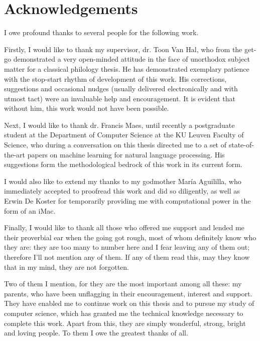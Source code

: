 

\begingroup
\let\clearpage\relax
\let\cleardoublepage\relax
\let\cleardoublepage\relax

\chapter{Acknowledgements}
\label{chap:acknowledgments}
\mtcaddchapter
I owe profound thanks to several people for the following
work. 

Firstly, I would like to thank my supervisor, dr. Toon Van Hal, who from
the get-go demonstrated a very open-minded attitude in the face of
unorthodox subject matter for a classical philology thesis. He has
demonstrated exemplary patience with the stop-start rhythm of
development of this work. His corrections, suggestions and occasional
nudges (usually delivered electronically and with utmost tact) were an
invaluable help and encouragement. It is evident that without him,
this work would not have been possible.

Next, I would like to thank dr. Francis Maes, until recently a
postgraduate student at the Department of Computer Science at the KU
Leuven Faculty of Science, who during a conversation on this thesis
directed me to a set of state-of-the-art papers on machine learning
for natural language processing. His suggestions form the
methodological bedrock of this work in its current form.

I would also like to extend my thanks to my godmother Mar\'ia
Aguililla, who immediately accepted to proofread this work and did so
diligently, as well as Erwin De Koster for temporarily providing me
with computational power in the form of an iMac.

Finally, I would like to thank all those who offered me support and
lended me their proverbial ear when the going got rough, most of whom
definitely know who they are: they are too many to number here and I
fear leaving any of them out; therefore I'll not mention any of
them. If any of them read this, may they know that in my mind, they
are not forgotten.

Two of them I mention, for they are the most important among all
these: my parents, who have been unflagging in their encouragement,
interest and support. They have enabled me to continue work on this
thesis and to pursue my study of computer science, which has granted
me the technical knowledge necessary to complete this work. Apart from
this, they are simply wonderful, strong, bright and loving people. To
them I owe the greatest thanks of all.

\endgroup



